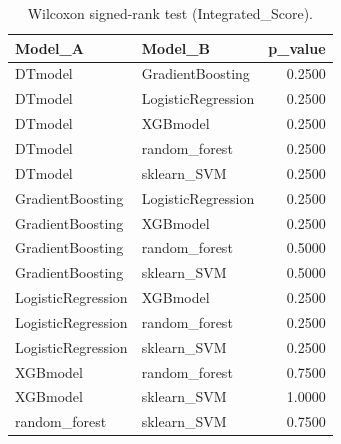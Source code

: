 \begin{table}[t]
\centering
\begin{tabular}{llr}
\toprule
Model_A & Model_B & p_value \\
\midrule
DTmodel & GradientBoosting & 0.2500 \\
DTmodel & LogisticRegression & 0.2500 \\
DTmodel & XGBmodel & 0.2500 \\
DTmodel & random_forest & 0.2500 \\
DTmodel & sklearn_SVM & 0.2500 \\
GradientBoosting & LogisticRegression & 0.2500 \\
GradientBoosting & XGBmodel & 0.2500 \\
GradientBoosting & random_forest & 0.5000 \\
GradientBoosting & sklearn_SVM & 0.5000 \\
LogisticRegression & XGBmodel & 0.2500 \\
LogisticRegression & random_forest & 0.2500 \\
LogisticRegression & sklearn_SVM & 0.2500 \\
XGBmodel & random_forest & 0.7500 \\
XGBmodel & sklearn_SVM & 1.0000 \\
random_forest & sklearn_SVM & 0.7500 \\
\bottomrule
\end{tabular}
\caption{Wilcoxon signed-rank test (Integrated_Score).}
\label{tab:wilcoxon_Integrated_Score}
\end{table}